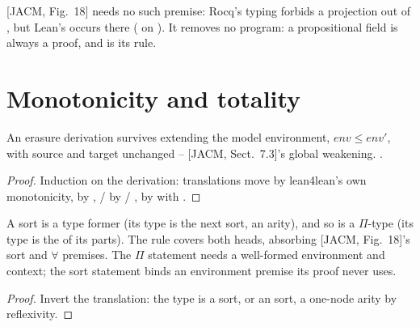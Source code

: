 \begin{remark}
 [JACM, Fig.\ 18] needs no such premise: Rocq's typing forbids a projection out of , but Lean's  occurs there ( on ). It removes no program: a propositional field is always a proof, and  is its rule.
\end{remark}

\section{Monotonicity and totality}
\label{sec:erases:total}

\begin{theorem}
\label{thm:Erases-mono}
\leanok
{}
 An erasure derivation survives extending the model environment, $\mathit{env} \le \mathit{env}'$, with source and target unchanged -- [JACM, Sect.\ 7.3]'s global weakening.
 \stProved{}.
\end{theorem}
\begin{proof}
\leanok
{}
 Induction on the derivation: translations move by lean4lean's own monotonicity,
 by , / by /
,  by  with .
\end{proof}

\begin{lemma}
\label{lem:Erases-sort_erasable}
\leanok
{}
 A sort is a type former (its type is the next sort, an arity), and so is a $\Pi$-type (its type is the  of its parts). The  rule covers both heads, absorbing [JACM, Fig.\ 18]'s sort and $\forall$ premises.
 The $\Pi$ statement needs a well-formed environment and context; the sort statement binds an environment premise its proof never uses.
\end{lemma}
\begin{proof}
\leanok
{}
 Invert the translation: the type is a sort, or an  sort, a one-node arity by reflexivity.
\end{proof}

